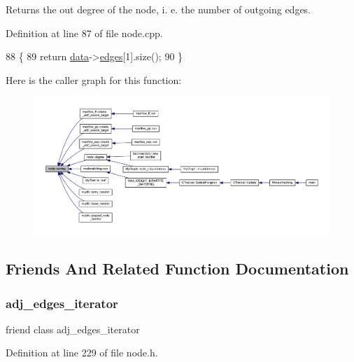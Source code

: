 Returns the out degree of the node, i. e. the number of outgoing edges. 

Definition at line 87 of file node.\+cpp.


\begin{DoxyCode}
88 \{
89     \textcolor{keywordflow}{return} \mbox{\hyperlink{classnode_a4ae3d54ebb61be3a102bedf5b91bef75}{data}}->\mbox{\hyperlink{classnode__data_a91690d6d2594423c2cdf8ea083c8bd75}{edges}}[1].size();
90 \}
\end{DoxyCode}
Here is the caller graph for this function\+:\nopagebreak
\begin{figure}[H]
\begin{center}
\leavevmode
\includegraphics[width=350pt]{classnode_a32adc45c4132e2642ccd2233d79ffe67_icgraph}
\end{center}
\end{figure}


\subsection{Friends And Related Function Documentation}
\mbox{\label{classnode_abdd49248203010f2d5432dfef22d017a}} 
\subsubsection{\texorpdfstring{adj\+\_\+edges\+\_\+iterator}{adj\_edges\_iterator}}
{\footnotesize\ttfamily friend class adj\+\_\+edges\+\_\+iterator\hspace{0.3cm}{\ttfamily [friend]}}



Definition at line 229 of file node.\+h.

\mbox{\label{classnode_a534891c80172dde5e777a3908cc6e2f1}} 
